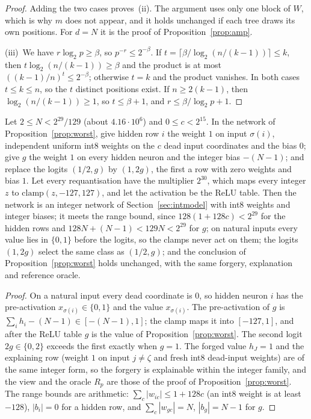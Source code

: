 \begin{proof}
Adding the two cases proves~(ii). The argument uses only one block of $W$, which is why $m$ does not
appear, and it holds unchanged if each tree draws its own positions. For $d=N$ it is the proof of
Proposition~\ref{prop:amp}.

(iii)~We have $r\log_2p\ge\beta$, so $p^{-r}\le2^{-\beta}$. If
$t=\lceil\beta/\log_2(n/(k-1))\rceil\le k$, then $t\log_2(n/(k-1))\ge\beta$ and the product is at most
$((k-1)/n)^t\le2^{-\beta}$; otherwise $t=k$ and the product vanishes. In both cases $t\le k\le n$, so
the $t$ distinct positions exist. If $n\ge2(k-1)$, then $\log_2(n/(k-1))\ge1$, so $t\le\beta+1$, and
$r\le\beta/\log_2p+1$.
\end{proof}

\begin{lemma}
\label{lem:worst-int}
Let $2\le N<2^{29}/129$ (about $4.16\cdot10^6$) and $0\le c<2^{15}$. In the network of
Proposition~\ref{prop:worst}, give hidden row $i$ the weight $1$ on input $\sigma(i)$, independent
uniform int8 weights on the $c$ dead input coordinates and the bias $0$; give $g$ the weight $1$ on
every hidden neuron and the integer bias $-(N-1)$; and replace the logits $(1/2,g)$ by $(1,2g)$, the
first a row with zero weights and bias $1$. Let every requantisation have the multiplier $2^{30}$,
which maps every integer $z$ to $\mathrm{clamp}(z,-127,127)$, and let the activation be the ReLU
table. Then the network is an integer network of Section~\ref{sec:intmodel} with int8 weights and
integer biases; it meets the range bound, since $128(1+128c)<2^{29}$ for the hidden rows and
$128N+(N-1)<129N<2^{29}$ for $g$; on natural inputs every value lies in $\{0,1\}$ before the logits,
so the clamps never act on them; the logits $(1,2g)$ select the same class as $(1/2,g)$; and the
conclusion of Proposition~\ref{prop:worst} holds unchanged, with the same forgery, explanation and
reference oracle.
\end{lemma}

\begin{proof}
On a natural input every dead coordinate is $0$, so hidden neuron $i$ has the pre-activation
$x_{\sigma(i)}\in\{0,1\}$ and the value $x_{\sigma(i)}$. The pre-activation of $g$ is
$\sum_ih_i-(N-1)\in[-(N-1),1]$; the clamp maps it into $[-127,1]$, and after the ReLU table $g$ is the value of
Proposition~\ref{prop:worst}. The second logit $2g\in\{0,2\}$ exceeds the first exactly when $g=1$.
The forged value $h_J=1$ and the explaining row (weight $1$ on input $j\neq\zeta$ and fresh int8
dead-input weights) are of the same integer form, so the forgery is explainable within the integer
family, and the view and the oracle $R_p$ are those of the proof of Proposition~\ref{prop:worst}. The
range bounds are arithmetic: $\sum_c|w_{ic}|\le1+128c$ (an int8 weight is at least $-128$), $|b_i|=0$ for a hidden row, and
$\sum_c|w_{gc}|=N$, $|b_g|=N-1$ for $g$.
\end{proof}

